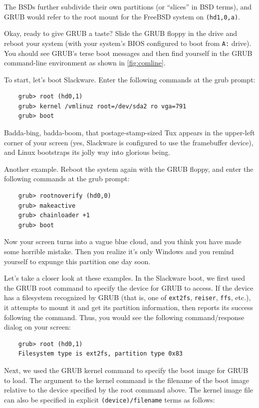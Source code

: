 \documentclass{article}
\begin{document}
The BSDs further subdivide their own partitions (or “slices” in BSD terms), and GRUB would refer to the root mount for the FreeBSD system on \texttt{(hd1,0,a)}.

Okay, ready to give GRUB a taste? Slide the GRUB floppy in the drive and reboot your system (with your system's BIOS configured to boot from \texttt{A:} drive). You should see GRUB's terse boot messages and then find yourself in the GRUB command-line environment as shown in \ref{fig:comline}.

To start, let's boot Slackware. Enter the following commands at the grub prompt:

\begin{verbatim}
    grub> root (hd0,1)
    grub> kernel /vmlinuz root=/dev/sda2 ro vga=791
    grub> boot
\end{verbatim}

Badda-bing, badda-boom, that postage-stamp-sized Tux appears in the upper-left corner of your screen (yes, Slackware is configured to use the framebuffer device), and Linux bootstraps its jolly way into glorious being.

Another example. Reboot the system again with the GRUB floppy, and enter the following commands at the grub prompt:

\begin{verbatim}
    grub> rootnoverify (hd0,0)
    grub> makeactive
    grub> chainloader +1
    grub> boot
\end{verbatim}

Now your screen turns into a vague blue cloud, and you think you have made some horrible mistake. Then you realize it's only Windows and you remind yourself to expunge this partition one day soon.

Let's take a closer look at these examples. In the Slackware boot, we first used the GRUB root command to specify the device for GRUB to access. If the device has a filesystem recognized by GRUB (that is, one of \texttt{ext2fs}, \texttt{reiser}, \texttt{ffs}, etc.), it attempts to mount it and get its partition information, then reports its success following the command. Thus, you would see the following command/response dialog on your screen:

\begin{verbatim}
    grub> root (hd0,1)
    Filesystem type is ext2fs, partition type 0x83
\end{verbatim}

Next, we used the GRUB kernel command to specify the boot image for GRUB to load.
The argument to the kernel command is the filename of the boot image
relative to the device specified by the root command above.
The kernel image file can also be specified in explicit \texttt{(device)/filename} terms as follows:
\end{document}
